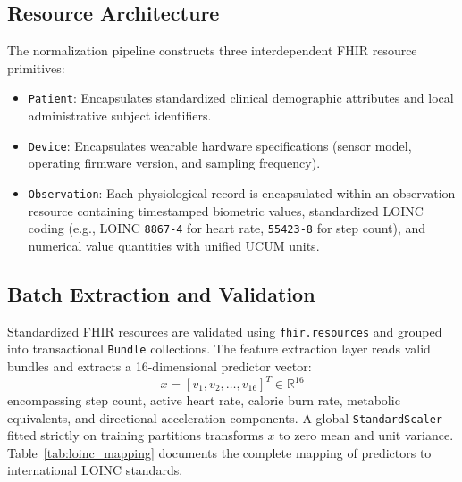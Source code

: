 \documentclass[journal,twocolumn,10pt]{IEEEtran}
\begin{document}
\subsection{Resource Architecture}
The normalization pipeline constructs three interdependent FHIR resource primitives:
\begin{itemize}
    \item \texttt{Patient}: Encapsulates standardized clinical demographic attributes and local administrative subject identifiers.
    \item \texttt{Device}: Encapsulates wearable hardware specifications (sensor model, operating firmware version, and sampling frequency).
    \item \texttt{Observation}: Each physiological record is encapsulated within an observation resource containing timestamped biometric values, standardized LOINC coding (e.g., LOINC \texttt{8867-4} for heart rate, \texttt{55423-8} for step count), and numerical value quantities with unified UCUM units.
\end{itemize}

\subsection{Batch Extraction and Validation}
Standardized FHIR resources are validated using \texttt{fhir.resources} and grouped into transactional \texttt{Bundle} collections. The feature extraction layer reads valid bundles and extracts a 16-dimensional predictor vector:
\begin{equation}
x = [v_1, v_2, \dots, v_{16}]^T \in \mathbb{R}^{16}
\end{equation}
encompassing step count, active heart rate, calorie burn rate, metabolic equivalents, and directional acceleration components. A global \texttt{StandardScaler} fitted strictly on training partitions transforms $x$ to zero mean and unit variance. Table~\ref{tab:loinc_mapping} documents the complete mapping of predictors to international LOINC standards.
\end{document}

